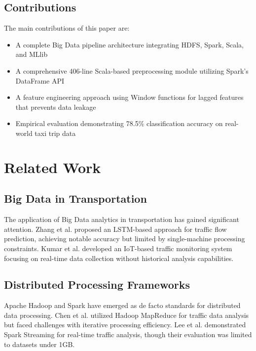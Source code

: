 \documentclass[conference]{IEEEtran}
\begin{document}
\subsection{Contributions}

The main contributions of this paper are:

\begin{itemize}
    \item A complete Big Data pipeline architecture integrating HDFS, Spark, Scala, and MLlib
    \item A comprehensive 406-line Scala-based preprocessing module utilizing Spark's DataFrame API
    \item A feature engineering approach using Window functions for lagged features that prevents data leakage
    \item Empirical evaluation demonstrating 78.5\% classification accuracy on real-world taxi trip data
\end{itemize}

\section{Related Work}

\subsection{Big Data in Transportation}

The application of Big Data analytics in transportation has gained significant attention. Zhang et al. \cite{zhang2023} proposed an LSTM-based approach for traffic flow prediction, achieving notable accuracy but limited by single-machine processing constraints. Kumar et al. \cite{kumar2022} developed an IoT-based traffic monitoring system focusing on real-time data collection without historical analysis capabilities.

\subsection{Distributed Processing Frameworks}

Apache Hadoop and Spark have emerged as de facto standards for distributed data processing. Chen et al. \cite{chen2021} utilized Hadoop MapReduce for traffic data analysis but faced challenges with iterative processing efficiency. Lee et al. \cite{lee2024} demonstrated Spark Streaming for real-time traffic analysis, though their evaluation was limited to datasets under 1GB.
\end{document}

